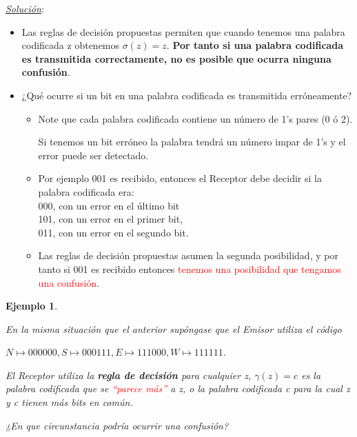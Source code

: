 \documentclass{beamer}
\theoremstyle{plain}
\theoremstyle{example}
\theoremstyle{example}
\newtheorem{ejemplo} [Ejemplo] {Ejemplo}
\begin{document}
\begin{frame}  \footnotesize
\textit{\underline{Solución}}:\\
\vspace{0.3cm}

\begin{itemize} 

\item  Las reglas de decisión propuestas permiten que cuando tenemos una palabra codificada z obtenemos $\sigma(z)=z$. \textbf{Por tanto si una palabra codificada es transmitida correctamente, no es posible que ocurra ninguna confusión}. 


\item ¿Qué ocurre si un bit en una palabra codificada es transmitida erróneamente? 

\begin{itemize} \footnotesize
\item Note que cada palabra codificada contiene un número de 1's pares (0 ó 2). 

Si tenemos un bit erróneo la palabra tendrá un número impar de 1's y el error puede ser detectado.
\vspace{0.1cm}
\item  Por ejemplo 001 es recibido, entonces el Receptor debe decidir si la palabra codificada era: 
\vspace{0.1cm}\\
000, con un error en el último bit\\ 
101, con un error en el primer bit,\\
011,  con un error en el segundo bit.\\ 
 \vspace{0.1cm}
\item Las reglas de decisión propuestas asumen la segunda posibilidad, y  por tanto si 001 es recibido entonces \textcolor{red}{tenemos una posibilidad que tengamos una confusión}. 
\end{itemize}



\end{itemize} \end{frame} 
\begin{frame}  \footnotesize

\begin{ejemplo}\label{ej:Robot2}

En la misma situación que el anterior supóngase que el Emisor utiliza el código

\begin{center}
$N \mapsto 000000,	S \mapsto 000111,	E \mapsto 111000,	W \mapsto 111111.$
\end{center}

El Receptor utiliza la \textbf{regla de decisión} para cualquier z, $\gamma(z)=c$ es la palabra codificada que se \textcolor{red}{``parece más''} a z, o la palabra codificada c para la cual z y c tienen más bits en común. 

¿En que circunstancia podría ocurrir una confusión?
\end{ejemplo}


\end{frame} 
\end{document}
